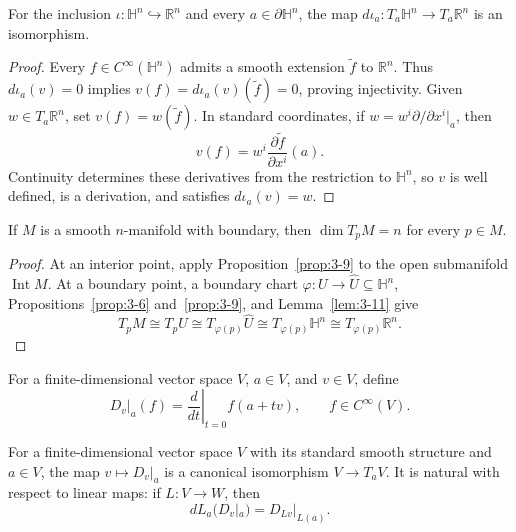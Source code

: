 \begin{lemma}
\label{lem:3-11}
\leanok
{}
For the inclusion $\iota:\mathbb{H}^n\hookrightarrow\mathbb{R}^n$ and every
$a\in\partial\mathbb{H}^n$, the map
$d\iota_a:T_a\mathbb{H}^n\to T_a\mathbb{R}^n$ is an isomorphism.
\end{lemma}

\begin{proof}
\leanok
\sketch
Every $f\in C^\infty(\mathbb{H}^n)$ admits a smooth extension
$\widetilde f$ to $\mathbb{R}^n$. Thus $d\iota_a(v)=0$ implies
$v(f)=d\iota_a(v)(\widetilde f)=0$, proving injectivity. Given
$w\in T_a\mathbb{R}^n$, set $v(f)=w(\widetilde f)$. In standard coordinates,
if $w=w^i\partial/\partial x^i|_a$, then
\[
v(f)=w^i\frac{\partial\widetilde f}{\partial x^i}(a).
\]
Continuity determines these derivatives from the restriction to
$\mathbb{H}^n$, so $v$ is well defined, is a derivation, and satisfies
$d\iota_a(v)=w$.
\end{proof}

\begin{proposition}
\label{prop:3-12}
\leanok
{}
If $M$ is a smooth $n$-manifold with boundary, then $\dim T_pM=n$ for every
$p\in M$.
\end{proposition}

\begin{proof}
\leanok
\sketch
At an interior point, apply Proposition~\ref{prop:3-9} to the open submanifold
$\operatorname{Int}M$. At a boundary point, a boundary chart
$\varphi:U\to\widehat U\subseteq\mathbb{H}^n$,
Propositions~\ref{prop:3-6} and~\ref{prop:3-9}, and
Lemma~\ref{lem:3-11} give
\[
T_pM\cong T_pU\cong T_{\varphi(p)}\widehat U
\cong T_{\varphi(p)}\mathbb{H}^n
\cong T_{\varphi(p)}\mathbb{R}^n.
\]
\end{proof}

\begin{definition}
\label{def:3-14-extra-2}
\mathlibok
For a finite-dimensional vector space $V$, $a\in V$, and $v\in V$, define
\[
D_v|_a(f)=\left.\frac{d}{dt}\right|_{t=0}f(a+tv),
\qquad f\in C^\infty(V). \tag{3.5}
\]
\end{definition}

\begin{proposition}
\label{prop:3-13}
\leanok
{}
For a finite-dimensional vector space $V$ with its standard smooth structure
and $a\in V$, the map $v\mapsto D_v|_a$ is a canonical isomorphism
$V\to T_aV$. It is natural with respect to linear maps: if $L:V\to W$, then
\[
dL_a(D_v|_a)=D_{Lv}|_{L(a)}. \tag{3.6}
\]
\end{proposition}


